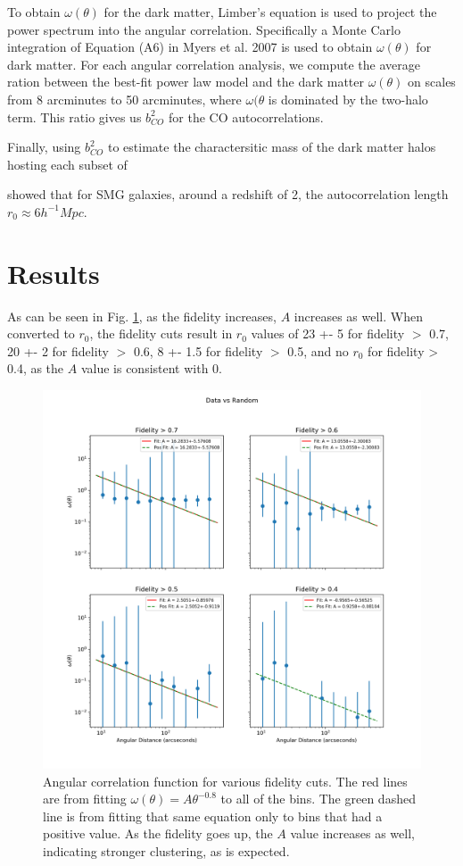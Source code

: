 To obtain $\omega(\theta)$ for the dark matter, Limber's equation is used to project the power spectrum into the angular correlation. Specifically a Monte Carlo integration of Equation (A6) in Myers et al. 2007 is used to obtain $\omega(\theta)$ for dark matter. For each angular correlation analysis, we compute the average ration between the best-fit power law model and the dark matter $\omega(\theta)$ on scales from 8 arcminutes to 50 arcminutes, where $\omega(\theta$ is dominated by the two-halo term. This ratio gives us $b^2_{CO}$ for the CO autocorrelations. 

Finally, using $b^2_{CO}$ to estimate the charactersitic mass of the dark matter halos hosting each subset of 

\cite{hickox2011clustering} showed that for SMG galaxies, around a redshift of 2, the autocorrelation length $r_0 \approx 6 h^{-1} Mpc$. 

\section{Results}

As can be seen in Fig. \ref{fig:Angular_correlation}, as the fidelity increases, $A$ increases as well. When converted to $r_0$, the fidelity cuts result in $r_0$ values of 23 +- 5 for fidelity $>$ 0.7, 20 +- 2 for fidelity $>$ 0.6, 8 +- 1.5 for fidelity $>$ 0.5, and no $r_0$ for fidelity > 0.4, as the $A$ value is consistent with 0. 

\begin{figure}[tbp]
\centering \includegraphics[width=120mm]{Fidelity/Log_4Panel_Data_Vs_Random_bin10_NFalse_Num10000.png}
\caption{Angular correlation function for various fidelity cuts. The red lines are from fitting $\omega(\theta) = A\theta^{-0.8} $ to all of the bins. The green dashed line is from fitting that same equation only to bins that had a positive value. As the fidelity goes up, the $A$ value increases as well, indicating stronger clustering, as is expected.}
\label{fig:Angular_correlation}
\end{figure}

